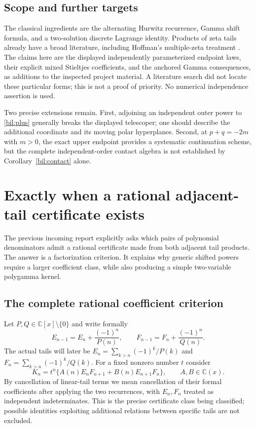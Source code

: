 \documentclass[11pt]{article}
\theoremstyle{definition}
\theoremstyle{remark}
\numberwithin{equation}{section}
\begin{document}
\subsection{Scope and further targets}

The classical ingredients are the alternating Hurwitz recurrence,
Gamma shift formula, and a two-solution discrete Lagrange identity.
Products of zeta tails already have a broad literature, including
Hoffman's multiple-zeta treatment \cite{bil:Hoffman}. The claims here
are the displayed independently parameterized endpoint laws, their
explicit mixed Stieltjes coefficients, and the anchored Gamma
consequences, as additions to the inspected project material. A
literature search did not locate these particular forms; this is not
a proof of priority. No numerical independence assertion is used.

Two precise extensions remain. First, adjoining an independent outer
power to \eqref{bil:plus} generally breaks the displayed telescoper;
one should describe the additional coordinate and its moving polar
hyperplanes. Second, at $p+q=-2m$ with $m>0$, the exact upper endpoint
provides a systematic continuation scheme, but the complete
independent-order contact algebra is not established by
Corollary~\ref{bil:contact} alone.


\section{Exactly when a rational adjacent-tail certificate exists}
\label{rat:section}

The previous incoming report explicitly asks which pairs of polynomial
denominators admit a rational certificate made from both adjacent
tail products. The answer is a factorization criterion. It explains
why generic shifted powers require a larger coefficient class, while
also producing a simple two-variable polygamma kernel.

\subsection{The complete rational coefficient criterion}

Let $P,Q\in\mathbb C[x]\setminus\{0\}$ and write formally
\[
 E_{n-1}=E_n+\frac{(-1)^n}{P(n)},\qquad
 F_{n-1}=F_n+\frac{(-1)^n}{Q(n)}.
\]
The actual tails will later be $E_n=\sum_{k>n}(-1)^k/P(k)$ and
$F_n=\sum_{k>n}(-1)^k/Q(k)$. For a fixed nonzero number $t$ consider
\begin{equation}\label{rat:ansatz}
 K_n=t^n\{A(n)E_nF_{n+1}+B(n)E_{n+1}F_n\},\qquad
 A,B\in\mathbb C(x).
\end{equation}
By cancellation of linear-tail terms we mean cancellation of their
formal coefficients after applying the two recurrences, with $E_n,F_n$
treated as independent indeterminates. This is the precise certificate
class being classified; possible identities exploiting additional
relations between specific tails are not excluded.
\end{document}
